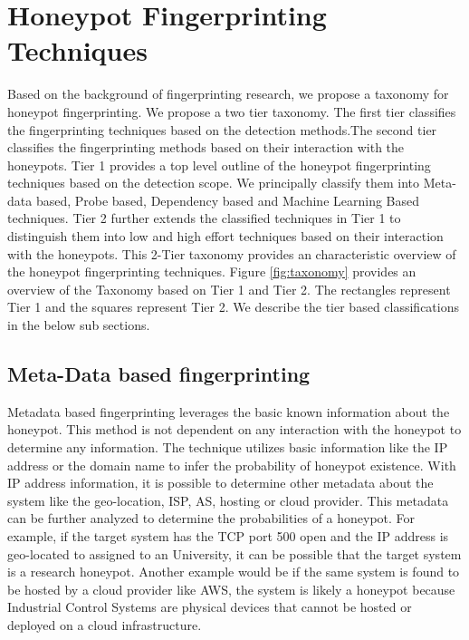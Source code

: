 \section{Honeypot Fingerprinting Techniques}
\label{sec:hft}



Based on the background of fingerprinting research, we propose a taxonomy for honeypot fingerprinting. 
We propose a two tier taxonomy. The first tier classifies the fingerprinting techniques based on the detection methods.The second tier classifies the fingerprinting methods based on their interaction with the honeypots.
Tier 1 provides a top level outline of the honeypot fingerprinting techniques based on the detection scope. We principally classify them into Meta-data based, Probe based, Dependency based and Machine Learning Based techniques. Tier 2 further extends the classified techniques in Tier 1 to distinguish them into low and high effort techniques based on their interaction with the honeypots. This 2-Tier taxonomy provides an characteristic overview of the honeypot fingerprinting techniques. Figure \ref{fig:taxonomy} provides an overview of the Taxonomy based on Tier 1 and Tier 2. The rectangles represent Tier 1 and the squares represent Tier 2. We describe the tier based classifications in the below sub sections. 


\subsection{Meta-Data based fingerprinting}
Metadata based fingerprinting leverages the basic known information about the honeypot. This method is  not dependent on any interaction with the honeypot to determine any information. The technique utilizes basic information like the IP address or the domain name to infer the probability of honeypot existence. With IP address information, it is possible to determine other metadata about the system like the geo-location, ISP, AS, hosting or cloud provider. This metadata can be further analyzed to determine the probabilities of a honeypot. For example, if the target system has the TCP port 500 open and the IP address is geo-located to assigned to an University, it can be possible that the target system is a research honeypot. Another example would be if the same system is found to be hosted by a cloud provider like AWS, the system is likely a honeypot because Industrial Control Systems are physical devices that cannot be hosted or deployed on a cloud infrastructure.


